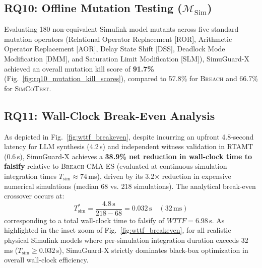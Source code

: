 \documentclass[journal]{IEEEtran}
\begin{document}
\begin{table}[!t]
\caption{Factorial Ablation Matrix Across 45 Falsifiable Specs}
\label{tab:rq9_ablation}
\centering
{}
\end{table}

\subsection{RQ10: Offline Mutation Testing (\texorpdfstring{$\mathcal{M}_{\text{Sim}}$}{M\_Sim})}
Evaluating 180 non-equivalent Simulink model mutants across five standard mutation operators (Relational Operator Replacement [ROR], Arithmetic Operator Replacement [AOR], Delay State Shift [DSS], Deadlock Mode Modification [DMM], and Saturation Limit Modification [SLM]), SimuGuard-X achieved an overall mutation kill score of \textbf{91.7\%} (Fig.~\ref{fig:rq10_mutation_kill_scores}), compared to 57.8\% for \textsc{Breach} and 66.7\% for \textsc{SimCoTest}.

\subsection{RQ11: Wall-Clock Break-Even Analysis}
As depicted in Fig.~\ref{fig:wttf_breakeven}, despite incurring an upfront 4.8-second latency for LLM synthesis (4.2\,s) and independent witness validation in RTAMT (0.6\,s), SimuGuard-X achieves a \textbf{38.9\% net reduction in wall-clock time to falsify} relative to \textsc{Breach}-CMA-ES (evaluated at continuous simulation integration times $T_{\mathrm{sim}} \approx 74$\,ms), driven by its 3.2$\times$ reduction in expensive numerical simulations (median 68 vs. 218 simulations). The analytical break-even crossover occurs at:
\begin{equation}
T_{\mathrm{sim}}^* = \frac{4.8\,\mathrm{s}}{218 - 68} = 0.032\,\mathrm{s} \quad (32\,\mathrm{ms})
\end{equation}
corresponding to a total wall-clock time to falsify of $WTTF = 6.98$\,s. As highlighted in the inset zoom of Fig.~\ref{fig:wttf_breakeven}, for all realistic physical Simulink models where per-simulation integration duration exceeds 32\,ms ($T_{\mathrm{sim}} \ge 0.032$\,s), SimuGuard-X strictly dominates black-box optimization in overall wall-clock efficiency.
\end{document}
